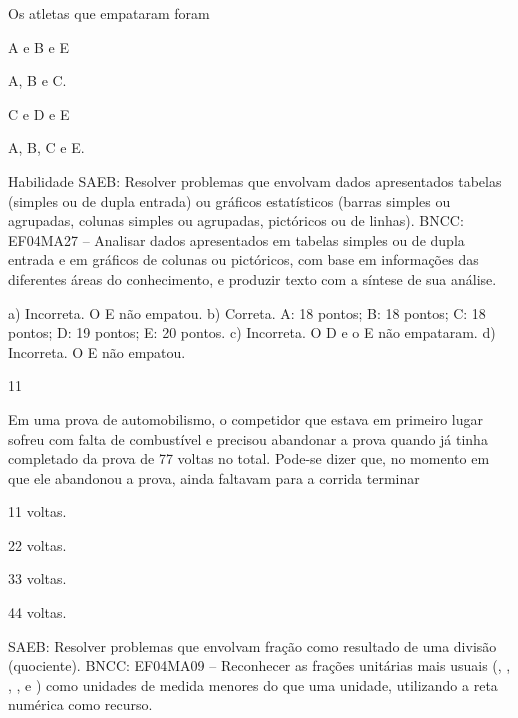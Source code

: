 \begin{mdframed}[linewidth=2pt,linecolor=salmao,roundcorner=2pt]
\begin{escolha}
{\begin{escolha}
\begin{escolha}



Os atletas que empataram foram

\begin{escolha}
\item
  A e B e E
\item
  A, B e C.
\item
  C e D e E
\item
  A, B, C e E.
\end{escolha}

Habilidade SAEB: Resolver problemas que envolvam dados apresentados tabelas (simples ou
de dupla entrada) ou gráficos estatísticos (barras simples ou agrupadas,
colunas simples ou agrupadas, pictóricos ou de linhas).
BNCC: EF04MA27 -- Analisar dados apresentados em tabelas simples ou de dupla entrada e em gráficos de
colunas ou pictóricos, com base em informações das diferentes áreas do conhecimento, e produzir
texto com a síntese de sua análise.

a) Incorreta. O E não empatou.
b) Correta. A: 18 pontos; B: 18 pontos; C: 18 pontos; D: 19 pontos; E: 20 pontos.
c) Incorreta. O D e o E não empataram.
d) Incorreta. O E não empatou.

\num{11}

Em uma prova de automobilismo, o competidor que estava em primeiro lugar
sofreu com falta de combustível e precisou abandonar a prova quando já
tinha completado  da prova de 77 voltas no total. Pode-se dizer que,
no momento em que ele abandonou a prova, ainda faltavam para a corrida
terminar

\begin{escolha}
\item
  11 voltas.
\item
  22 voltas.
\item
  33 voltas.
\item
  44 voltas.
\end{escolha}

SAEB: Resolver problemas que envolvam fração como resultado
de uma divisão (quociente).
BNCC: EF04MA09 -- Reconhecer as frações unitárias mais usuais (, , , ,  e ) como
unidades de medida menores do que uma unidade, utilizando a reta numérica como recurso.


\end{escolha}
\end{escolha}}
\end{escolha}
\end{mdframed}
